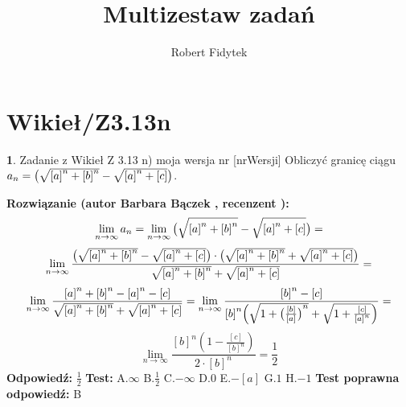 \documentclass[12pt, a4paper]{article}
\title{Multizestaw zadań}
\author{Robert Fidytek}
\date{}
\theoremstyle{definition} %
\newtheorem{zad}{}
\newcommand{\kategoria}[1]{\section{#1}} %
\newcommand{\zadStart}[1]{\begin{zad}#1\newline} %
\newcommand{\zadStop}{\end{zad}}   %
\newcommand{\rozwStart}[2]{\noindent \textbf{Rozwiązanie (autor #1 , recenzent #2): }\newline} %
\newcommand{\rozwStop}{\newline}                                            %
\newcommand{\odpStart}{\noindent \textbf{Odpowiedź:}\newline}    %
\newcommand{\odpStop}{\newline}                                             %
\newcommand{\testStart}{\noindent \textbf{Test:}\newline} %
\newcommand{\testStop}{\newline} %
\newcommand{\kluczStart}{\noindent \textbf{Test poprawna odpowiedź:}\newline} %
\newcommand{\kluczStop}{\newline} %
\begin{document}
\maketitle


\kategoria{Wikieł/Z3.13n}
\zadStart{Zadanie z Wikieł Z 3.13 n) moja wersja nr [nrWersji]}
Obliczyć granicę ciągu $a_n= \big{(} \sqrt{{[a]}^n + {[b]}^n} - \sqrt{{[a]}^n + [c]} \big{)}$.
\zadStop
\rozwStart{Barbara Bączek}{}
$$\lim_{n \rightarrow \infty} a_n= \lim_{n \rightarrow \infty} \big{(} \sqrt{{[a]}^n + {[b]}^n} - \sqrt{{[a]}^n + [c]} \big{)} =$$
$$  \lim_{n \rightarrow \infty} \frac{\big{(} \sqrt{{[a]}^n + {[b]}^n} - \sqrt{{[a]}^n + [c]} \big{)}\cdot \big{(}\sqrt{{[a]}^n + {[b]}^n} + \sqrt{{[a]}^n + [c]}\big{)}}{\sqrt{{[a]}^n + {[b]}^n } + \sqrt{{[a]}^n + [c]}}= $$
$$\lim_{n \rightarrow \infty} \frac{{[a]}^n + {[b]}^n - {[a]}^n -[c]}{\sqrt{{[a]}^n + {[b]}^n } + \sqrt{{[a]}^n + [c]}}= \lim_{n \rightarrow \infty} \frac{{[b]}^n -[c]}{{[b]}^n\Big{(}\sqrt{1 + {\big{(}\frac{[b]}{[a]}\big{)}}^n } + \sqrt{1 + \frac{[c]}{{[a]}^n}}\Big{)}}= $$
$$\lim_{n \rightarrow \infty} \frac{{[b]}^n(1-\frac{[c]}{{[b]}^n})}{2 \cdot {[b]}^n }= \frac{1}{2}$$
\rozwStop
\odpStart
$\frac{1}{2}$
\odpStop
\testStart
A.$\infty$
B.$\frac{1}{2}$
C.$-\infty$
D.$0$
E.$-[a]$
G.$1$
H.$-1$
\testStop
\kluczStart
B
\kluczStop
\end{document}
